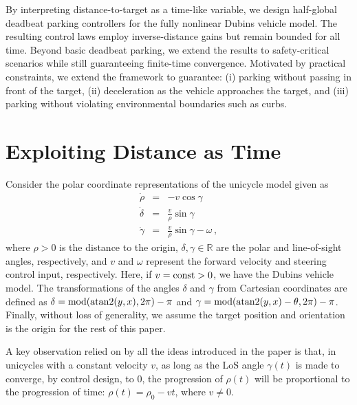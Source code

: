 \documentclass[letterpaper, 10 pt, conference]{ieeeconf}  %
\begin{document}
By interpreting distance-to-target as a time-like variable, we design half-global deadbeat parking controllers for the fully nonlinear Dubins vehicle model. The resulting control laws employ inverse-distance gains but remain bounded for all time. Beyond basic deadbeat parking, we extend the results to safety-critical scenarios while still guaranteeing finite-time convergence. Motivated by practical constraints, we extend the framework to guarantee: (i) parking without passing in front of the target, (ii) deceleration as the vehicle approaches the target, and (iii) parking without violating environmental boundaries such as curbs.

\section{Exploiting Distance as Time}

Consider the polar coordinate representations of the unicycle model given as
\begin{subequations}
\label{eq:unicycle_polar}
\begin{eqnarray}
\label{eq:unicycle_polar-rho}
\dot{\rho} &=& 
-v \cos\gamma\\
\label{eq:unicycle_polar-delta}
\dot{\delta} &=&  \frac{v}{\rho} \sin\gamma
\\
\label{eq:unicycle_polar-gamma}
\dot{\gamma} &=&  \frac{v}{\rho} \sin\gamma -\omega  \,,
\end{eqnarray} 
\end{subequations}
where $\rho > 0$ is the distance to the origin, $\delta,\gamma \in \mathbb{R}$ are the polar and line-of-sight angles, respectively, and $v$ and $\omega$ represent the forward velocity and steering control input, respectively. Here, if $v=\mbox{\rm const}>0$, we have the Dubins vehicle model. The transformations of the angles $\delta$ and $\gamma$ from Cartesian coordinates are defined as $\delta = \mbox{mod}(\text{{\rm atan2}}(y ,x ),2\pi) - \pi$ and $\gamma = \mbox{mod}(\text{{\rm atan2}}(y ,x )-\theta, 2\pi) - \pi$. Finally, without loss of generality, we assume the target position and orientation is the origin for the rest of this paper.

A key observation relied on by all the ideas introduced in the paper is that, in unicycles with a constant velocity $v$, as long as the LoS angle $\gamma(t)$ is made to converge, by control design, to $0$, the progression of $\rho(t)$ will be proportional to the progression of time: $\rho(t) = \rho_0-vt$, where $v\neq 0$. 
\end{document}
